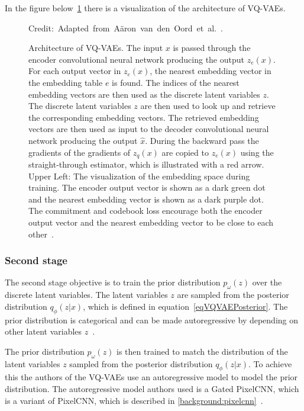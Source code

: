 In the figure below~\ref{VQVAEFigure} there is a visualization of the architecture of VQ-VAEs.

\begin{figure}
    \centering 
    
    \caption[Architecture of VQ-VAEs.]%
    { 
        Architecture of VQ-VAEs. The input $x$ is passed through the encoder convolutional neural network producing the output $z_e(x)$. For each output vector in $z_e(x)$, the nearest embedding vector in the embedding table $e$ is found. The indices of the nearest embedding vectors are then used as the discrete latent variables $z$. The discrete latent variables $z$ are then used to look up and retrieve the corresponding embedding vectors. The retrieved embedding vectors are then used as input to the decoder convolutional neural network producing the output $\hat{x}$. During the backward pass the gradients of the gradients of $z_q(x)$ are copied to $z_e(x)$ using the straight-through estimator, which is illustrated with a red arrow.
        Upper Left: The visualization of the embedding space during training.  The encoder output vector is shown as a dark green dot and the nearest embedding vector is shown as a dark purple dot. The commitment and codebook loss encourage both the encoder output vector and the nearest embedding vector to be close to each other~\cite{vqvae}.
    }
  	\medskip 
	\hspace*{15pt}\hbox{\scriptsize Credit: Adapted from Aäron van den Oord et al.~\cite{vqvae}.}\label{VQVAEFigure}
\end{figure}

\subsubsection{Second stage}

The second stage objective is to train the prior distribution $p_{\omega}(z)$ over the discrete latent variables. The latent variables $z$ are sampled from the posterior distribution $q_{\phi}(z|x)$, which is defined in equation~\ref{eqVQVAEPosterior}. The prior distribution is categorical and can be made autoregressive by depending on other latent variables $z$~\cite{vqvae}.

The prior distribution $p_{\omega}(z)$ is then trained to match the distribution of the latent variables $z$ sampled from the posterior distribution $q_{\phi}(z|x)$. To achieve this the authors of the VQ-VAEs use an autoregressive model to model the prior distribution. The autoregressive model authors used is a Gated PixelCNN, which is a variant of PixelCNN, which is described in \autoref{background:pixelcnn}~\cite{vqvae}.

